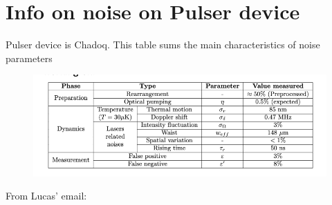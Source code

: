 \documentclass{article}
\begin{document}
\section{Info on noise on Pulser device}

Pulser device is Chadoq. This table sums the main characteristics of noise parameters

\begin{figure}[h!]
	\includegraphics{info_q}
\end{figure}

From Lucas' email:
\end{document}

